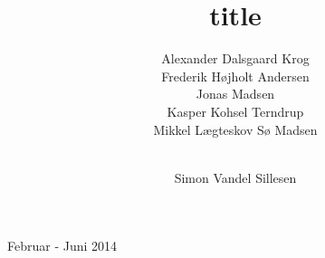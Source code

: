 \author{Alexander Dalsgaard Krog \andnext\\
    Frederik Højholt Andersen \andnext\\
    Jonas Madsen \andnext\\
    Kasper Kohsel Terndrup \andnext\\
    Mikkel Lægteskov Sø Madsen \and\\
    Simon Vandel Sillesen}

\title{title}

\begin{titlingpage}

\vspace*{2cm}
     \makebox[\linewidth]{
     }
     \vfill
     \centerline{Februar - Juni 2014}
     \clearpage


\end{titlingpage}
